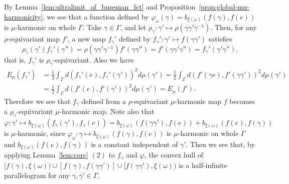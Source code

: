 \documentclass[12pt]{amsart}
\numberwithin{equation}{section}
\theoremstyle{plain}
\theoremstyle{definition}
\theoremstyle{remark}
\newcommand{\ray}[1]{[#1)}
\begin{document}
 
 By Lemma~\ref{lem:ultralimit_of_buseman_fct} and
 Proposition~\ref{prop:global-mu-harmonicity}, we see that a function defined by 
 $\varphi_{\omega}(\gamma)=b_{\xi(\omega)}(f(\gamma),f(e))$
 is $\mu$-harmonic on whole $\Gamma$. 
 Take $\gamma \in \Gamma$,  and let 
 $\rho_{\gamma}\colon \gamma'\mapsto \rho(\gamma\gamma'\gamma^{-1})$. 
 Then, for any $\rho$-equivariant map $f'$, a new map $f_{\gamma}'$
 defined by $f_{\gamma}'\colon \gamma'\mapsto f(\gamma \gamma')$
 satisfies
\begin{equation*}
 \rho_{\gamma}(\gamma')f_{\gamma}'(\gamma'')
 = \rho(\gamma \gamma' \gamma^{-1})f'(\gamma \gamma'')
 = f'(\gamma \gamma' \gamma'') = f_{\gamma}'(\gamma' \gamma''), 
\end{equation*}
 that is, $f_{\gamma}'$ is $\rho_{\gamma}$-equivariant.  Also we
 have
\begin{equation*}
\begin{split}
  E_{\mu}(f_{\gamma}')
  & =\frac{1}{2}\int_{\Gamma} d(f_{\gamma}'(e),f_{\gamma}'(\gamma'))^2
  d\mu(\gamma')
  = \frac{1}{2}\int_{\Gamma} d(f'(\gamma e),f'(\gamma\gamma'))^2
  d\mu(\gamma') \\
  & = \frac{1}{2 }\int_{\Gamma}d(f'(e),f'(\gamma'))^2 d\mu(\gamma')
  = E_{\mu}(f'). 
\end{split}
\end{equation*}
 Therefore we see that $f_{\gamma}$ defined from a $\rho$-equivariant
 $\mu$-harmonic map $f$ becomes a $\rho_{\gamma}$-equivariant
 $\mu$-harmonic map. 
 Note also that 
\begin{equation*}
 \varphi\colon \gamma' \mapsto b_{\xi(\omega)}(f_{\gamma}(\gamma'),f_{\gamma}(e))
  =b_{\xi(\omega)}(f(\gamma \gamma'), f(e)) + 
   b_{\xi(\omega)}(f(e),f(\gamma))
\end{equation*}
 is $\mu$-harmonic, since
 $\varphi_{\omega}\colon \gamma \mapsto b_{\xi(\omega)}(f(\gamma),f(e))$
 is $\mu$-harmonic on whole $\Gamma$ and
 $b_{\xi(\omega)}(f(e),f(\gamma))$ is a constant independent of
 $\gamma'$. 
 Then we see that, 
 by applying Lemma~\ref{lem:core} $(2)$ to
 $f_{\gamma}$ and  $\varphi$, the convex hull of 
 $\ray{f(\gamma),\xi(\omega)}\cup[f(\gamma),f(\gamma \gamma')] 
 \cup \ray{f(\gamma \gamma'),\xi(\omega)}$
 is a half-infinite parallelogram for any 
 $\gamma, \gamma' \in \Gamma$. 
\end{document}
